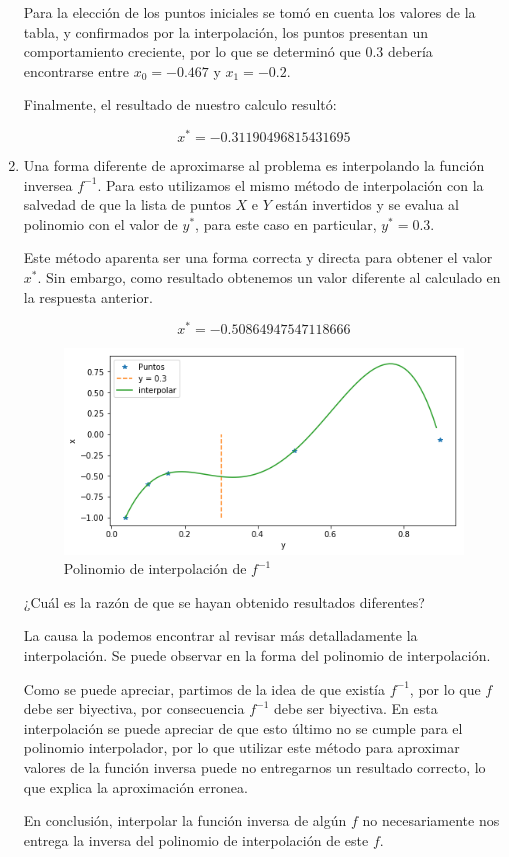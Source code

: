 \documentclass[spanish, fleqn]{article}
\begin{document}
\begin{enumerate}
	Para la elección de los puntos iniciales se tomó en cuenta los valores de la tabla, y confirmados por la interpolación, los puntos presentan un comportamiento creciente, por lo que se determinó que $0.3$ debería encontrarse entre $x_0 = -0.467$ y $x_1=-0.2$.
	
  
	Finalmente, el resultado de nuestro calculo resultó:
	
		$$x^* = -0.31190496815431695$$  
  
  \item %
  
  Una forma diferente de aproximarse al problema es interpolando la función inversea $f^{-1}$. Para esto utilizamos el mismo método de interpolación con la salvedad de que la lista de puntos $X$ e $Y$ están invertidos y se evalua al polinomio con el valor de $y^*$, para este caso en particular, $y^* = 0.3$.
  
  Este método aparenta ser una forma correcta y directa para obtener el valor $x^*$. Sin embargo, como resultado obtenemos un valor diferente al calculado en la respuesta anterior.
  
  $$x^* = -0.50864947547118666$$
  
   \begin{figure}[h]
	\caption{Polinomio de interpolación de $f^{-1}$}   
	\centering
 	\includegraphics[scale=0.6]{interpolacioninversa.png}
   \end{figure}
  
  
  ¿Cuál es la razón de que  se hayan obtenido resultados diferentes?
  
   La causa la podemos encontrar al revisar más detalladamente la interpolación. Se puede observar en la forma del polinomio de interpolación.
     
  Como se puede apreciar, partimos de la idea de que existía $f^{-1}$, por lo que $f$ debe ser biyectiva, por consecuencia $f^{-1}$ debe ser biyectiva. En esta interpolación se puede apreciar de que esto último no se cumple para el polinomio interpolador, por lo que utilizar este método para aproximar valores de la función inversa puede no entregarnos un resultado correcto, lo que explica la aproximación erronea.
  
   En conclusión, interpolar la función inversa de algún $f$ no necesariamente nos entrega la inversa del polinomio de interpolación de este $f$.
  \end{enumerate}
\end{document}
